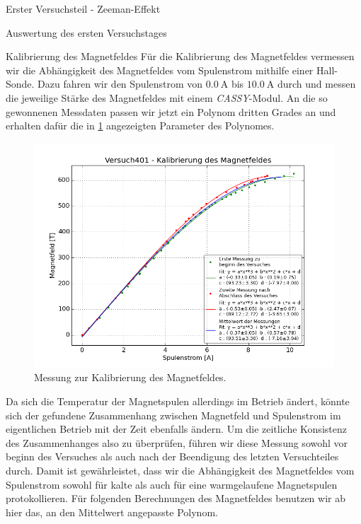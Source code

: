 \documentclass[pdftex, a4paper,11pt, twoside, ngerman]{report}
\begin{document}
\begin{chapter}{Erster Versuchsteil - Zeeman-Effekt}
\begin{section}{Auswertung des ersten Versuchstages}
      \begin{subsection}{Kalibrierung des Magnetfeldes}
        \label{chp:Zeeman:sec:AuswertungMagnetfeld}
        Für die Kalibrierung des Magnetfeldes vermessen wir die Abhängigkeit
        des Magnetfeldes vom Spulenstrom mithilfe einer Hall-Sonde. Dazu fahren
        wir den Spulenstrom von $\SI{0.0}{\ampere}$ bis $\SI{10.0}{\ampere}$
        durch und messen die jeweilige Stärke des Magnetfeldes mit einem
        \textit{CASSY}-Modul. An die so gewonnenen Messdaten passen wir jetzt
        ein Polynom dritten Grades an und erhalten dafür die in
        \cref{fig:MagnetfeldKalibrierung} angezeigten Parameter des Polynomes.
        \begin{figure}[ht]
          \centering
          \includegraphics[width=\textwidth]
              {Figures/Versuch401-KalibrierungdesMagnetfeldes.png}
          \caption{Messung zur Kalibrierung des Magnetfeldes.}
          \label{fig:MagnetfeldKalibrierung}
        \end{figure}
        \newline
        Da sich die Temperatur der Magnetspulen allerdings im Betrieb ändert,
        könnte sich der gefundene Zusammenhang zwischen Magnetfeld und
        Spulenstrom im eigentlichen Betrieb mit der Zeit ebenfalls ändern.
        Um die zeitliche Konsistenz des Zusammenhanges also zu überprüfen,
        führen wir diese Messung sowohl vor beginn des Versuches als auch nach
        der Beendigung des letzten Versuchteiles durch. Damit ist
        gewährleistet, dass wir die Abhängigkeit des Magnetfeldes vom 
        Spulenstrom sowohl für kalte als auch für eine warmgelaufene
        Magnetspulen protokollieren.
        \newline
        Für folgenden Berechnungen des Magnetfeldes benutzen wir ab hier das,
        an den Mittelwert angepasste Polynom.
        

\end{subsection}
\end{section}
\end{chapter}
\end{document}
